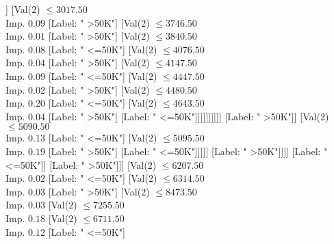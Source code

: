 \documentclass[margin=10pt]{standalone}
\begin{document}
\begin{forest}
															[Val($2$) $ \leq 5009.50$ \\ Imp. $0.02$
																[Val($2$) $ \leq 4841.50$ \\ Imp. $0.04$
																	[Val($2$) $ \leq 2357.50$ \\ Imp. $0.03$
																		[Val($2$) $ \leq 2187.50$ \\ Imp. $0.25$
																			[Label: " >50K"]
																			[Label: " <=50K"]]
																		[Val($2$) $ \leq 3017.50$ \\ Imp. $0.09$
																			[Label: " >50K"]
																			[Val($2$) $ \leq 3746.50$ \\ Imp. $0.01$
																				[Label: " >50K"]
																				[Val($2$) $ \leq 3840.50$ \\ Imp. $0.08$
																					[Label: " <=50K"]
																					[Val($2$) $ \leq 4076.50$ \\ Imp. $0.04$
																						[Label: " >50K"]
																						[Val($2$) $ \leq 4147.50$ \\ Imp. $0.09$
																							[Label: " <=50K"]
																							[Val($2$) $ \leq 4447.50$ \\ Imp. $0.02$
																								[Label: " >50K"]
																								[Val($2$) $ \leq 4480.50$ \\ Imp. $0.20$
																									[Label: " <=50K"]
																									[Val($2$) $ \leq 4643.50$ \\ Imp. $0.04$
																										[Label: " >50K"]
																										[Label: " <=50K"]]]]]]]]]]
																	[Label: " >50K"]]
																[Val($2$) $ \leq 5090.50$ \\ Imp. $0.13$
																	[Label: " <=50K"]
																	[Val($2$) $ \leq 5095.50$ \\ Imp. $0.19$
																		[Label: " >50K"]
																		[Label: " <=50K"]]]]]
														[Label: " >50K"]]]]
											[Label: " <=50K"]]
										[Label: " >50K"]]]
								[Val($2$) $ \leq 6207.50$ \\ Imp. $0.02$
									[Label: " <=50K"]
									[Val($2$) $ \leq 6314.50$ \\ Imp. $0.03$
										[Label: " >50K"]
										[Val($2$) $ \leq 8473.50$ \\ Imp. $0.03$
											[Val($2$) $ \leq 7255.50$ \\ Imp. $0.18$
												[Val($2$) $ \leq 6711.50$ \\ Imp. $0.12$
													[Label: " <=50K"]

\end{forest}
\end{document}
